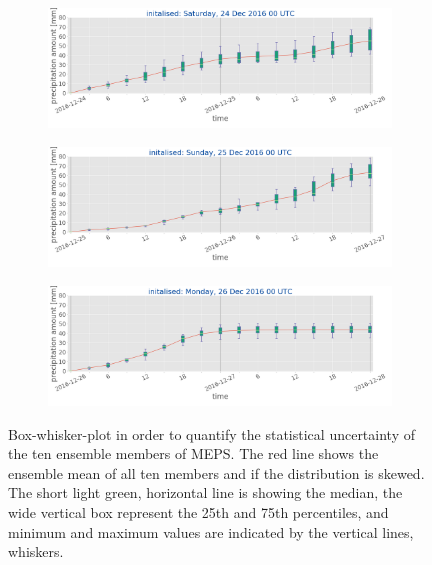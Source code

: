 \begin{figure}[ht!]
	\centering
	\begin{subfigure}[b]{\textwidth}
		\centering
		\includegraphics[trim ={0cm 2.2cm 0cm 0cm},clip,width=\textwidth]{./fig_boxplot_sfc/20161224_0}
		\caption{}\label{fig:boxplot:24}
	\end{subfigure}
	\begin{subfigure}[b]{\textwidth}
		\centering
		\includegraphics[trim ={0cm 2.2cm 0cm 0cm},clip,width=\textwidth]{./fig_boxplot_sfc/20161225_0}
		\caption{}\label{fig:boxplot:25}
	\end{subfigure}
	\begin{subfigure}[b]{\textwidth}
		\centering
		\includegraphics[trim ={0cm 1.cm 0cm 0cm},clip,width=\textwidth]{./fig_boxplot_sfc/20161226_0}
		\caption{}\label{fig:boxplot:26}
	\end{subfigure}
	\caption{Box-whisker-plot in order to quantify the statistical uncertainty of the ten ensemble members of MEPS. The red line shows the ensemble mean of all ten members and if the distribution is skewed. The short light green, horizontal line is showing the median, the wide vertical box represent the 25th and 75th percentiles, and minimum and maximum values are indicated by the vertical lines, whiskers.}\label{fig:boxplot}
\end{figure}
